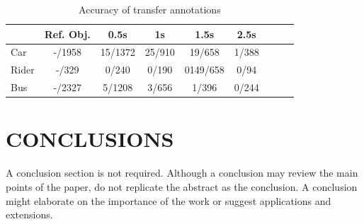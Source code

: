 \documentclass[letterpaper, 10 pt, conference]{ieeeconf}  %
\begin{document}
\begin{table}[h]
	\centering
	\caption{Accuracy of transfer annotations}
	\label{tab:metrics}
	\begin{tabular}{|l|c|c|c|c|c|c|c|c|}
		\hline
		&Ref. Obj.&0.5s & 1s &1.5s&2.5s \\
		\hline
		 Car &-/1958& 15/1372 & 25/910 & 19/658 &  1/388\\
		\hline
  		 Rider &-/329& 0/240 & 0/190 & 0149/658 &  0/94\\
		\hline
  		 Bus &-/2327& 5/1208 & 3/656 & 1/396 &  0/244\\
\hline
	\end{tabular}
\end{table}


\section{CONCLUSIONS}
\label{conclusions}
A conclusion section is not required. Although a conclusion may review the main points of the paper, do not replicate the abstract as the conclusion. A conclusion might elaborate on the importance of the work or suggest applications and extensions.

\addtolength{\textheight}{-12cm}   %




\end{document}
